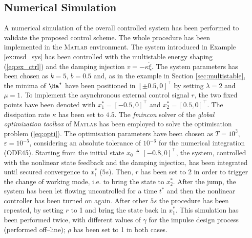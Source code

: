 \subsection{Numerical Simulation}
%
A numerical simulation of the overall controlled system has been performed to validate the proposed control scheme. The whole procedure has been implemented in the \textsc{Matlab}\textsuperscript{\textregistered}%
environment. The system introduced in Example \ref{ex:msd_sys} has been controlled with the multistable energy shaping (\ref{eq:ex_ctrl}) and the damping injection $v = -\kappa\dot{\xi}$. The system parameters has been chosen as $k = 5$, $b = 0.5$ and, as in the example in Section \ref{sec:multistable}, the minima of $\Ha^*$ have been positioned in $[\pm 0.5,0]^\top$ by setting $\lambda = 2$ and $\mu = 1$.
{%
To implement the asynchronous external control signal $r$, the two fixed points have been denoted with $x_1^* = [-0.5,0]^\top$ and $x_2^* = [0.5,0]^\top$.}
The dissipation rate $\kappa$ has been set to $4.5$. 
The \textit{fmincon} solver of the \textit{global optimization toolbox} of \textsc{Matlab}\textsuperscript{\textregistered} has been employed to solve the optimisation problem (\ref{eq:opti}). The optimisation parameters have been chosen as $T=10^3$, $\varepsilon=10^{-5}$, considering an absolute tolerance of $10^{-6}$ for the numerical integration (ODE45).
Starting from the initial state $x_0 \triangleq [-0.8,0]^\top$, the system, controlled with the nonlinear state feedback and the damping injection, has been integrated until secured convergence to $x_1^*$ ($5s$). Then, $r$ has been set to 2 in order to trigger the change of working mode, i.e. to bring the state to $x_2^*$. After the jump, the system has been let flowing uncontrolled for a time $t^*$ and then the nonlinear controller has been turned on again. After other $5s$ the procedure has been repeated, by setting $r$ to 1 and bring the state back in $x_1^*$.
This simulation has been performed twice, with different values of $\gamma$ for the impulse design process (performed off--line); $\rho$ has been set to 1 in both cases. 

